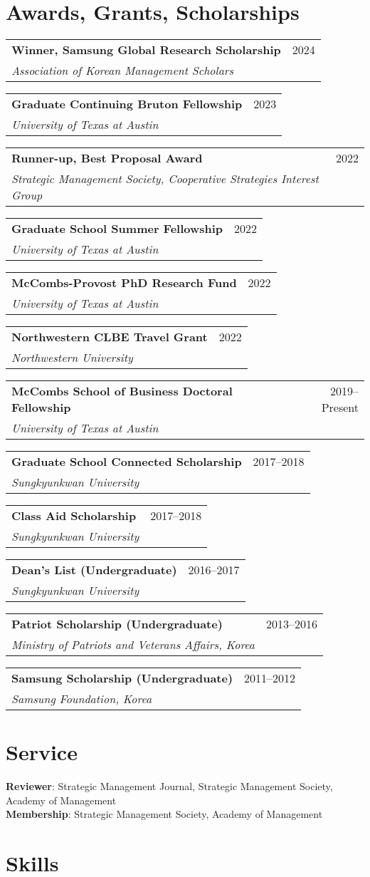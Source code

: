 \documentclass[a4paper,11pt]{article}
\makeatletter
\newcommand{\resumeSubheading}[4]{
    \vspace{1pt}
    \begin{tabular*}{0.97\textwidth}{l@{\extracolsep{\fill}}r}
        \textbf{#1} & #2 \\
        \textit{\small#3} & \textit{\small#4}
    \end{tabular*}
}
\makeatother
\begin{document}
\section{Awards, Grants, Scholarships}

\resumeSubheading
{Winner, Samsung Global Research Scholarship} {2024}
{Association of Korean Management Scholars}{}
\resumeSubheading
{Graduate Continuing Bruton Fellowship} {2023}
{University of Texas at Austin}{}
\resumeSubheading
{Runner-up, Best Proposal Award} {2022}
{Strategic Management Society, Cooperative Strategies Interest Group}{}
\resumeSubheading
{Graduate School Summer Fellowship} {2022}
{University of Texas at Austin}{}
\resumeSubheading
{McCombs-Provost PhD Research Fund} {2022}
{University of Texas at Austin}{}
\resumeSubheading
{Northwestern CLBE Travel Grant} {2022}
{Northwestern University}{}
\resumeSubheading
{McCombs School of Business Doctoral Fellowship} {2019–Present}
{University of Texas at Austin}{}
\resumeSubheading
{Graduate School Connected Scholarship} {2017–2018}
{Sungkyunkwan University}{}
\resumeSubheading
{Class Aid Scholarship} {2017–2018}
{Sungkyunkwan University}{}
\resumeSubheading
{Dean's List (Undergraduate)} {2016–2017}
{Sungkyunkwan University}{}
\resumeSubheading
{Patriot Scholarship (Undergraduate)} {2013–2016}
{Ministry of Patriots and Veterans Affairs, Korea}{}
\resumeSubheading
{Samsung Scholarship (Undergraduate)} {2011–2012}
{Samsung Foundation, Korea}{}

\section{Service}

\textbf{Reviewer}{: Strategic Management Journal, Strategic Management Society, Academy of Management}
\\
\textbf{Membership}{: Strategic Management Society, Academy of Management}

\section{Skills}
\end{document}
